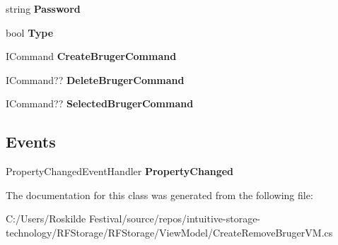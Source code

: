 \begin{DoxyCompactItemize}
string {\bfseries Password}
\item 
\mbox{\label{class_r_f_storage_1_1_view_model_1_1_create_remove_bruger_v_m_a62325353571d2fad42cc1760b409efce}} 
bool {\bfseries Type}
\item 
\mbox{\label{class_r_f_storage_1_1_view_model_1_1_create_remove_bruger_v_m_a954f513b01a1be15dcd08467fa4650bb}} 
I\+Command {\bfseries Create\+Bruger\+Command}
\item 
\mbox{\label{class_r_f_storage_1_1_view_model_1_1_create_remove_bruger_v_m_a18e2f46d7a56841db693ffa90d88676d}} 
I\+Command?? {\bfseries Delete\+Bruger\+Command}
\item 
\mbox{\label{class_r_f_storage_1_1_view_model_1_1_create_remove_bruger_v_m_a2b2aa0234ac8cdc89a5ec020045cc911}} 
I\+Command?? {\bfseries Selected\+Bruger\+Command}
\end{DoxyCompactItemize}
\subsection*{Events}
\begin{DoxyCompactItemize}
\item 
\mbox{\label{class_r_f_storage_1_1_view_model_1_1_create_remove_bruger_v_m_a11b55d0b1c81d22e6e3aabf302ce8687}} 
Property\+Changed\+Event\+Handler {\bfseries Property\+Changed}
\end{DoxyCompactItemize}


The documentation for this class was generated from the following file\+:\begin{DoxyCompactItemize}
\item 
C\+:/\+Users/\+Roskilde Festival/source/repos/intuitive-\/storage-\/technology/\+R\+F\+Storage/\+R\+F\+Storage/\+View\+Model/Create\+Remove\+Bruger\+V\+M.\+cs\end{DoxyCompactItemize}
